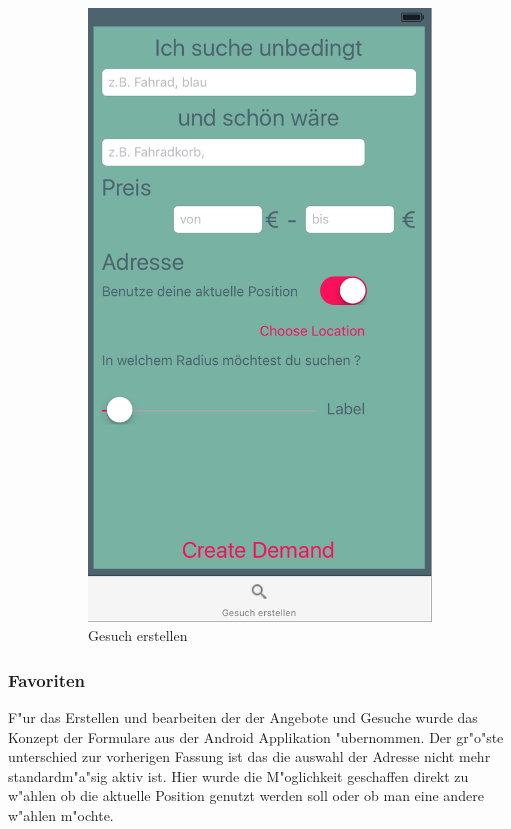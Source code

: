 \begin{figure}[H]
\begin{subfigure}{0.5\textwidth}
\includegraphics[width=0.9\linewidth]{./Bilder/ioscreatedemand.png}
\caption{Gesuch erstellen}
\label{fig:iosdemand}
\end{subfigure}
\caption{}
\label{fig:image10}
\end{figure}
\subsubsection*{Favoriten}

F"ur das Erstellen und bearbeiten der der Angebote und Gesuche wurde das Konzept der Formulare aus der Android Applikation "ubernommen.
Der gr"o"ste unterschied zur vorherigen Fassung ist das die auswahl der Adresse nicht mehr standardm"a"sig aktiv ist. 
Hier wurde die M"oglichkeit geschaffen direkt zu w"ahlen ob die aktuelle Position genutzt werden soll oder ob man eine andere w"ahlen m"ochte.

